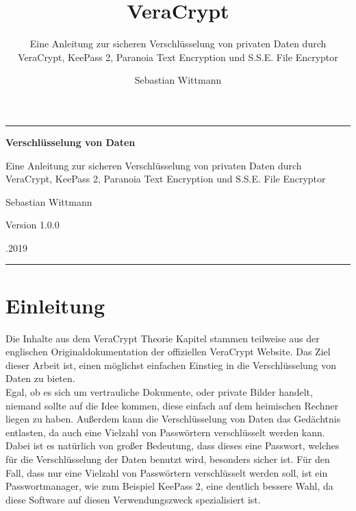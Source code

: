 \documentclass[12pt,a4paper]{scrreprt}
\author{Sebastian Wittmann}
\title{VeraCrypt}
\subtitle{Eine Anleitung zur sicheren Verschlüsselung von privaten Daten durch VeraCrypt, KeePass 2, Paranoia Text Encryption und S.S.E. File Encryptor}
\begin{document}
\begin{titlepage}
\begin{center}
\noindent\rule{470pt}{0.4pt}\par
\vspace{6cm}
{\fontsize{29.86pt}{29.86pt}\selectfont \textbf{Verschlüsselung von Daten}} \par
\vspace{0.5cm}
{\fontsize{17.28pt}{17.28pt}\selectfont Eine Anleitung zur sicheren Verschlüsselung von privaten Daten durch VeraCrypt, KeePass 2, Paranoia Text Encryption und S.S.E. File Encryptor}\par
\vspace{3cm}
{\fontsize{20.74pt}{20.74pt}\selectfont Sebastian Wittmann} \par
\vspace{2cm}
{\fontsize{14pt}{14pt}\selectfont Version 1.0.0}\par
\vspace{9cm}
{\fontsize{14pt}{14pt}.2019}
\noindent\rule{470pt}{0.4pt}
\end{center}
\end{titlepage}
\tableofcontents

\chapter{Einleitung}
Die Inhalte aus dem VeraCrypt Theorie Kapitel stammen teilweise aus der englischen Originaldokumentation der offiziellen VeraCrypt Website. Das Ziel dieser Arbeit ist, einen möglichst einfachen Einstieg in die Verschlüsselung von Daten zu bieten.\\

\noindent Egal, ob es sich um vertrauliche Dokumente, oder private Bilder handelt, niemand sollte auf die Idee kommen, diese einfach auf dem heimischen Rechner liegen zu haben. Außerdem kann die Verschlüsselung von Daten das Gedächtnis entlasten, da auch eine Vielzahl von Passwörtern verschlüsselt werden kann. Dabei ist es natürlich von großer Bedeutung, dass dieses eine Passwort, welches für die Verschlüsselung der Daten benutzt wird, besonders sicher ist. Für den Fall, dass nur eine Vielzahl von Passwörtern verschlüsselt werden soll, ist ein Passwortmanager, wie zum Beispiel KeePass 2, eine deutlich bessere Wahl, da diese Software auf diesen Verwendungszweck spezialisiert ist.\\
\end{document}
